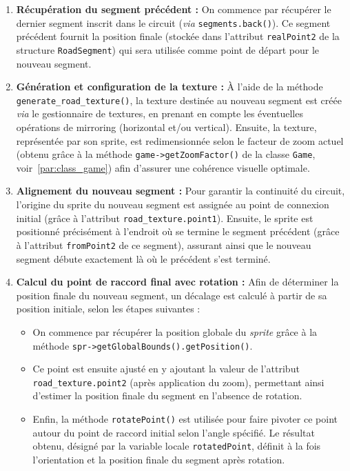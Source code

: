 \begin{enumerate}
    \item \textbf{Récupération du segment précédent :} %
    On commence par récupérer le dernier segment inscrit dans le circuit (\textit{via} \texttt{segments.back()}).
    Ce segment précédent fournit la position finale (stockée dans l'attribut \texttt{realPoint2} de la structure \texttt{RoadSegment}) qui sera utilisée comme point de départ pour le nouveau segment.

    \item \textbf{Génération et configuration de la texture :}
    À l'aide de la méthode \\\texttt{generate\_road\_texture()}, la texture destinée au nouveau segment est créée \textit{via} le gestionnaire de textures, en prenant en compte les éventuelles opérations de mirroring (horizontal et/ou vertical).
    Ensuite, la texture, représentée par son \gls{sprite}, est redimensionnée selon le facteur de zoom actuel (obtenu grâce à la méthode \texttt{game->getZoomFactor()} de la classe \texttt{Game}, voir~\ref{par:class_game}) afin d'assurer une cohérence visuelle optimale.

    \item \textbf{Alignement du nouveau segment :}
    Pour garantir la continuité du circuit, l'origine du \gls{sprite} du nouveau segment est assignée au point de connexion initial (grâce à l'attribut \texttt{road\_texture.point1}).
    Ensuite, le \gls{sprite} est positionné précisément à l'endroit où se termine le segment précédent (grâce à l'attribut \texttt{fromPoint2} de ce segment), assurant ainsi que le nouveau segment débute exactement là où le précédent s'est terminé.

    \item \textbf{Calcul du point de raccord final avec rotation :}
    Afin de déterminer la position finale du nouveau segment, un décalage est calculé à partir de sa position initiale, selon les étapes suivantes :
    \begin{itemize}
        \item On commence par récupérer la position globale du \textit{\gls{sprite}} grâce à la méthode \texttt{spr->getGlobalBounds().getPosition()}.
        \item Ce point est ensuite ajusté en y ajoutant la valeur de l'attribut \texttt{road\_texture.point2} (après application du zoom), permettant ainsi d'estimer la position finale du segment en l'absence de rotation.
        \item Enfin, la méthode \texttt{rotatePoint()} est utilisée pour faire pivoter ce point autour du point de raccord initial selon l'angle spécifié.
        Le résultat obtenu, désigné par la variable locale \texttt{rotatedPoint}, définit à la fois l'orientation et la position finale du segment après rotation.
    \end{itemize}


\end{enumerate}
